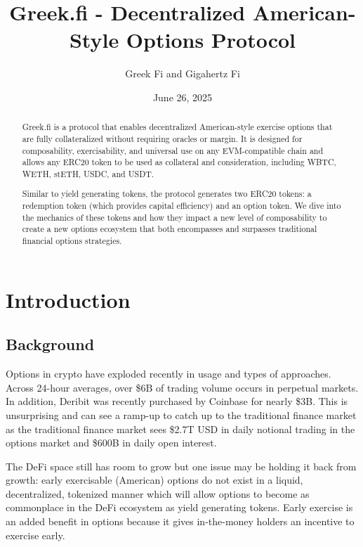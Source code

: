 \documentclass[%
 reprint,
 amsmath,amssymb,
 aps,
]{revtex4-2}
\newcommand{\greekfi}{Greek.fi }
\begin{document}
\title{\greekfi - Decentralized American-Style Options Protocol}

\author{Greek Fi and Gigahertz Fi}
\affiliation{%
\greekfi 
}

\date{June 26, 2025}

\begin{abstract}
\greekfi is a protocol that enables decentralized American-style exercise options that are fully collateralized without requiring oracles or margin. 
It is designed for composability, exercisability, and universal use on any EVM-compatible chain and allows any ERC20 token to be used as collateral and consideration, including WBTC, WETH, stETH, USDC, and USDT. 

Similar to yield generating tokens, the protocol generates two ERC20 tokens: a redemption token (which provides capital efficiency) and an option token.
We dive into the mechanics of these tokens and how they impact a new level of composability to create a new options ecosystem that both encompasses and surpasses traditional financial options strategies.


\end{abstract}

\maketitle

\section{Introduction}

\subsection{Background}
Options in crypto have exploded recently in usage and types of approaches. 
Across 24-hour averages, over \$6B of trading volume occurs in perpetual markets. 
In addition, Deribit was recently purchased by Coinbase for nearly \$3B. 
This is unsurprising and can see a ramp-up to catch up to the traditional finance market as the traditional finance market sees \$2.7T USD in daily notional trading in the options market and \$600B in daily open interest. 

The DeFi space still has room to grow but one issue may be holding it back from growth: early exercisable (American) options do not exist in a liquid, decentralized, tokenized manner which will allow options to become as commonplace in the DeFi ecosystem as yield generating tokens. 
Early exercise is an added benefit in options because it gives in-the-money holders an incentive to exercise early.
\end{document}
